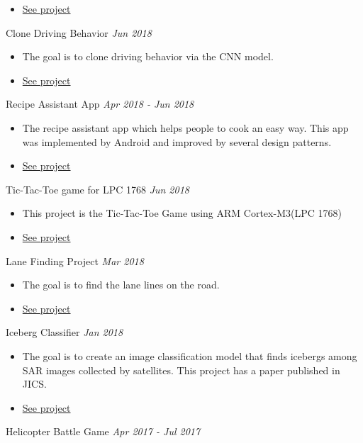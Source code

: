 \documentclass[10pt]{article}
\newenvironment{changemargin}[2]{
  \begin{list}{}{
    \setlength{\topsep}{0pt}
    \setlength{\leftmargin}{#1}
    \setlength{\rightmargin}{#2}
    \setlength{\listparindent}{\parindent}
    \setlength{\itemindent}{\parindent}
    \setlength{\parsep}{\parskip}
  }
  \item[]}{\end{list}
}
\newcommand{\project}[2]{
	{#1} \hfill \emph{#2}\\ \medskip
}
\newenvironment{body} {
	\vspace*{-16pt}
	\begin{changemargin}{-0.25in}{-0.5in}
  }
	{\end{changemargin}
}
\begin{document}
\begin{body}
\begin{itemize}
      \item \href{https://github.com/jeongwhanchoi/CarND-Vehicle-Detection}{See project}
  	\end{itemize}
\project{Clone Driving  Behavior}{Jun 2018}
\begin{itemize} \itemsep -0pt  %
      \item  The goal is to clone driving behavior via the CNN model.
      \item \href{https://github.com/jeongwhanchoi/CarND-Behavioral-Cloning}{See project}
  	\end{itemize}
\project{Recipe Assistant App}{Apr 2018 - Jun 2018}
\begin{itemize} \itemsep -0pt  %
      \item  The recipe assistant app which helps people to cook an easy way. This app was implemented by Android and improved by several design patterns.
      \item \href{https://github.com/jeongwhanchoi/recipe-assistant-app}{See project}
  	\end{itemize}
\project{Tic-Tac-Toe game for LPC 1768}{Jun 2018}
\begin{itemize} \itemsep -0pt  %
      \item  This project is the Tic-Tac-Toe Game using ARM Cortex-M3(LPC 1768)
      \item \href{https://github.com/jeongwhanchoi/tic-tac-toe-lpc1768}{See project}
  	\end{itemize}
\project{Lane Finding Project}{Mar 2018}
\begin{itemize} \itemsep -0pt  %
      \item  The goal is to find the lane lines on the road.
      \item \href{https://github.com/jeongwhanchoi/CarND-LaneLines}{See project}
  	\end{itemize}
\project{Iceberg Classifier}{Jan 2018}
\begin{itemize} \itemsep -0pt  %
      \item  The goal is to create an image classification model that finds icebergs among SAR images collected by satellites. This project has a paper published in JICS.
      \item \href{https://github.com/jeongwhanchoi/MLND-Capstone-Project}{See project}
  	\end{itemize}
\project{Helicopter Battle Game}{Apr 2017 - Jul 2017}

\end{body}
\end{document}
